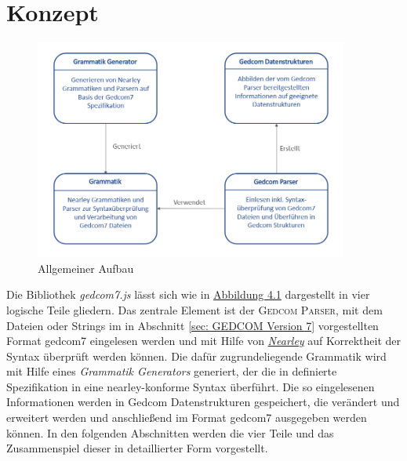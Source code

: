 \chapter{Konzept}
\label{chap: Konzept}

\begin{figure}[b]
	\centering
	\includegraphics[width=0.92\textwidth]{images/konzept_allgemein.png}
	\caption{Allgemeiner Aufbau}
	\label{fig: Allgemeiner Aufbau}
\end{figure}

Die Bibliothek \textit{gedcom7.js} lässt sich wie in \hyperref[fig: Allgemeiner Aufbau]{Abbildung 4.1} dargestellt in vier logische Teile gliedern. Das zentrale Element ist der \textsc{Gedcom Parser}, mit dem Dateien oder Strings im in Abschnitt \ref{sec: GEDCOM Version 7} vorgestellten Format gedcom7 eingelesen werden und mit Hilfe von \hyperref[sec: Nearley]{\textit{Nearley}} auf Korrektheit der Syntax überprüft werden können. Die dafür zugrundeliegende Grammatik wird mit Hilfe eines \textit{Grammatik Generators} generiert, der die in \cite{GEDCOM} definierte Spezifikation in eine nearley-konforme Syntax überführt. Die so eingelesenen Informationen werden in Gedcom Datenstrukturen gespeichert, die verändert und erweitert werden und anschließend im Format gedcom7 ausgegeben werden können. In den folgenden Abschnitten werden die vier Teile und das Zusammenspiel dieser in detaillierter Form vorgestellt.

